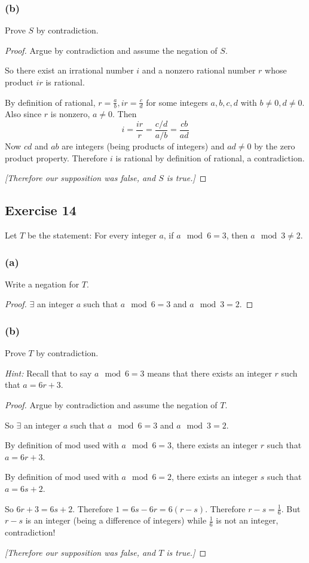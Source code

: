 \documentclass[14pt]{extarticle}
\newcommand{\te}{\exists}
\begin{document}
\subsubsection{(b)}
Prove $S$ by contradiction.

\begin{proof}
Argue by contradiction and assume the negation of $S$.

So there exist an irrational number $i$ and a nonzero rational number $r$ whose product $ir$ is rational.

By definition of rational, $r = \frac{a}{b}, ir = \frac{c}{d}$ for some integers $a,b,c,d$ with $b \neq 0, d \neq 0$. Also since $r$ is nonzero, $a \neq 0$.
Then 
\[
i = \frac{ir}{r} = \frac{c/d}{a/b} = \frac{cb}{ad}
\]
Now $cd$ and $ab$ are integers (being products of integers) and $ad \neq 0$ by the zero product property. Therefore $i$ is rational by definition of rational, a contradiction.

{\it [Therefore our supposition was false, and $S$ is true.]}
\end{proof}

\subsection{Exercise 14}
Let $T$ be the statement: For every integer $a$, if $a \mod 6 = 3$, then $a \mod 3 \neq 2$.

\subsubsection{(a)}
Write a negation for $T$.

\begin{proof}
$\te$ an integer $a$ such that $a \mod 6 = 3$ and $a \mod 3 = 2$.
\end{proof}

\subsubsection{(b)}
Prove $T$ by contradiction.

{\it Hint:} Recall that to say $a \mod 6 = 3$ means that there exists an integer $r$ such that $a = 6r + 3$.

\begin{proof}
Argue by contradiction and assume the negation of $T$.

So $\te$ an integer $a$ such that $a \mod 6 = 3$ and $a \mod 3 = 2$.

By definition of mod used with $a \mod 6 = 3$, there exists an integer $r$ such that $a = 6r + 3$.

By definition of mod used with $a \mod 6 = 2$, there exists an integer $s$ such that $a = 6s + 2$.

So $6r + 3 = 6s + 2$. Therefore $1 = 6s - 6r = 6(r-s)$. Therefore $r-s = \frac{1}{6}$. But $r-s$ is an integer (being a difference of integers) while $\frac{1}{6}$ is not an integer, contradiction!

{\it [Therefore our supposition was false, and $T$ is true.]}
\end{proof}
\end{document}

